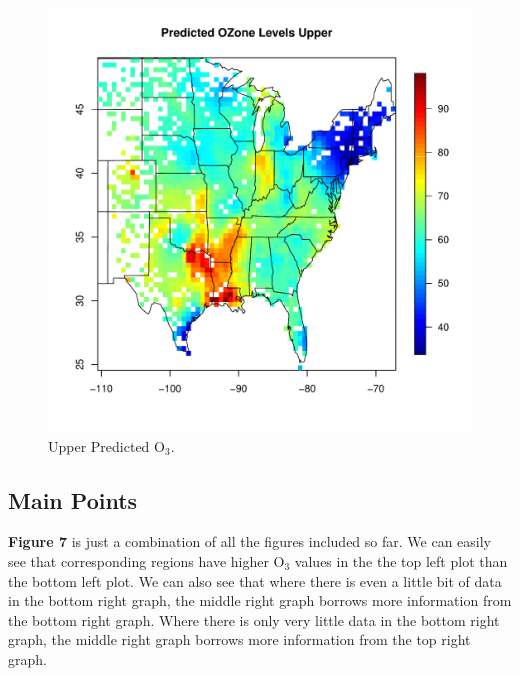 \documentclass{article}                                                   %
\def\beginmyfig{\begin{figure}[htbp]\begin{center}}                       %
\def\endmyfig{\end{center}\end{figure}}                                   %
\begin{document}
    \beginmyfig
      \includegraphics{raw/upper.pdf}
      \caption{Upper Predicted O$_3$.}
    \endmyfig

    
  \subsection{Main Points}
    \textbf{Figure 7} is just a combination of all the figures included so far. 
    We can easily see that corresponding regions have higher O$_3$ values 
    in the the top left plot than the bottom left plot. We can also see that
    where there is even a little bit of data in the bottom right graph, the middle
    right graph borrows more information from the bottom right graph. Where there
    is only very little data in the bottom right graph, the middle right graph
    borrows more information from the top right graph.
\end{document}
